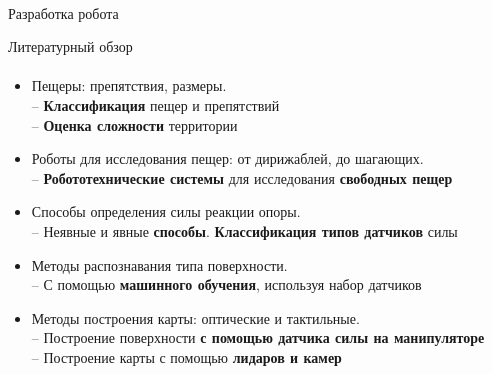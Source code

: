 \documentclass[aspectratio=169,xcolor=table,10pt]{beamer}
\begin{document}
\begin{frame}[c]{}
    \framesubtitle{}
    \centering\LARGE Разработка робота
\end{frame}

\begin{frame}[t]{Литературный обзор}
    \framesubtitle{}
    \vspace{-0.65cm}
    \begin{itemize}
        \item Пещеры: препятствия, размеры. \\ \alert{-- \textbf{Классификация} пещер и препятствий \\ -- \textbf{Оценка сложности} территории}
        \item Роботы для исследования пещер: от дирижаблей, до шагающих. \\ \alert{-- \textbf{Робототехнические системы} для исследования \textbf{свободных пещер}}
        \item Способы определения силы реакции опоры. \\ \alert{-- Неявные и явные \textbf{способы}. \textbf{Классификация типов датчиков} силы}
        \item Методы распознавания типа поверхности. \\ \alert{-- С помощью \textbf{машинного обучения}, используя набор датчиков}
        \item Методы построения карты: оптические и тактильные. \\ \alert{-- Построение поверхности \textbf{с помощью датчика силы на манипуляторе} \\ -- Построение карты с помощью \textbf{лидаров и камер}}
    \end{itemize}

\end{frame}
\end{document}
